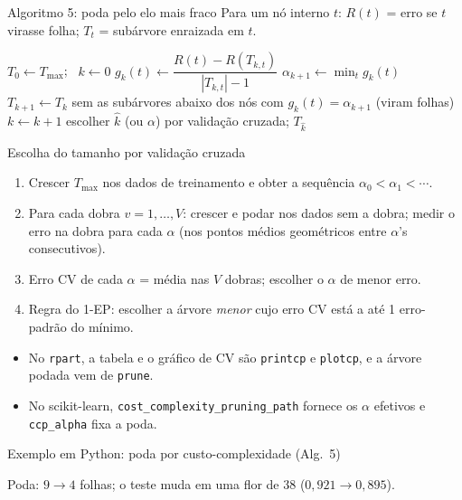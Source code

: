 \documentclass[aspectratio=169]{beamer}
\newcommand{\aPrune}{5}
\begin{document}
\begin{frame}[t]{Algoritmo \aPrune: poda pelo elo mais fraco}
\small
Para um nó interno $t$: $R(t)$ = erro se $t$ virasse folha; $T_t$ = subárvore enraizada em $t$.
\begin{algorithmic}[1]
\State $T_0\gets T_{\max}$; \ $k\gets0$
    \State $g_k(t)\gets\dfrac{R(t)-R(T_{k,t})}{|T_{k,t}|-1}$ 
  \EndFor
  \State $\alpha_{k+1}\gets\min_t g_k(t)$
  \State $T_{k+1}\gets T_k$ sem as subárvores abaixo dos nós com $g_k(t)=\alpha_{k+1}$ (viram folhas)
  \State $k\gets k+1$
\EndWhile
\State escolher $\hat k$ (ou $\alpha$) por validação cruzada; \Return $T_{\hat k}$
\end{algorithmic}
\end{frame}

\begin{frame}{Escolha do tamanho por validação cruzada}
\begin{enumerate}
  \item Crescer $T_{\max}$ nos dados de treinamento e obter a sequência $\alpha_0<\alpha_1<\cdots$.
  \item Para cada dobra $v=1,\dots,V$: crescer e podar nos dados sem a dobra; medir o erro na dobra para cada $\alpha$ (nos pontos médios geométricos entre $\alpha$'s consecutivos).
  \item Erro CV de cada $\alpha$ = média nas $V$ dobras; escolher o $\alpha$ de menor erro.
  \item \alert{Regra do 1-EP}: escolher a árvore \emph{menor} cujo erro CV está a até 1 erro-padrão do mínimo.
\end{enumerate}
\vspace{6pt}
\begin{itemize}
  \item No \texttt{rpart}, a tabela e o gráfico de CV são \texttt{printcp} e \texttt{plotcp}, e a árvore podada vem de \texttt{prune}.
  \item No scikit-learn, \texttt{cost\_complexity\_pruning\_path} fornece os $\alpha$ efetivos e \texttt{ccp\_alpha} fixa a poda.
\end{itemize}
\end{frame}

\begin{frame}[fragile]{Exemplo em Python: poda por custo-complexidade (Alg.~\aPrune)}

\begin{minipage}{0.5\linewidth}

\end{minipage}\hfill
\begin{minipage}{0.47\linewidth}\footnotesize
Poda: $9\to4$ folhas; o teste muda em \alert{uma} flor de $38$ ($0{,}921\to0{,}895$).
\end{minipage}
\end{frame}
\end{document}
